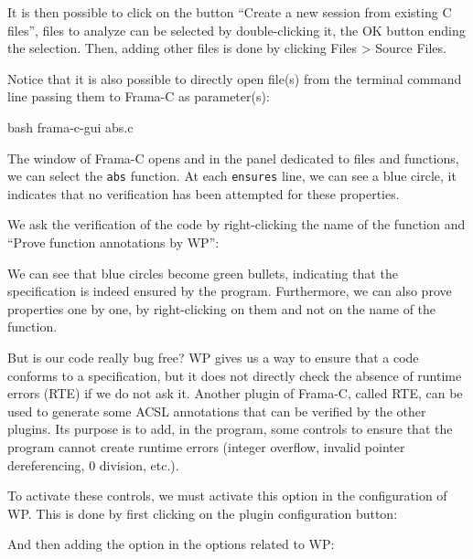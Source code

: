 It is then possible to click on the button ``Create a new session from
existing C files'', files to analyze can be selected by double-clicking
it, the OK button ending the selection. Then, adding other files is
done by clicking Files > Source Files.



Notice that it is also possible to directly open file(s) from the
terminal command line passing them to Frama-C as parameter(s):



\begin{CodeBlock}{bash}
frama-c-gui abs.c
\end{CodeBlock}





The window of Frama-C opens and in the panel dedicated to files and
functions, we can select the \texttt{abs} function. At each
\texttt{ensures} line, we can see a blue circle, it indicates that no
verification has been attempted for these properties.



We ask the verification of the code by right-clicking the name of the
function and ``Prove function annotations by WP'':





We can see that blue circles become green bullets, indicating that the
specification is indeed ensured by the program. Furthermore, we can also prove
properties one by one, by right-clicking on them and not on the name of
the function.



But is our code really bug free? WP gives us a way to ensure that a code
conforms to a specification, but it does not directly check the absence
of runtime errors (RTE) if we do not ask it. Another plugin of Frama-C,
called RTE, can be used to generate some ACSL annotations that can be verified
by the other plugins. Its purpose is to add, in the program, some controls to
ensure that the program cannot create runtime errors (integer overflow,
invalid pointer dereferencing, 0 division, etc.).



To activate these controls, we must activate this option in the configuration
of WP. This is done by first clicking on the plugin configuration button:




And then adding the option  in the options related to WP:


